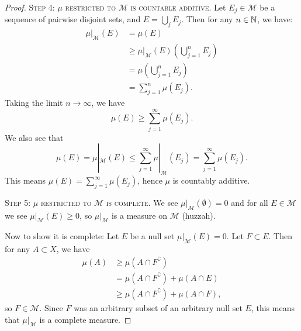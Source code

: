 \begin{proof}
\textsc{Step 4: $\mu$ restricted to $\mathcal{M}$ is countable additive.}
Let $E_{j}\in\mathcal{M}$ be a sequence of pairwise disjoint sets, and
$E=\bigcup_{j}E_{j}$. Then for any $n\in\mathbb{N}$, we have:
\begin{subequations}
  \begin{align}
\mu|_{\mathcal{M}}(E) &= \mu(E)\\
&\geq\mu|_{\mathcal{M}}(E)\left(\bigcup^{n}_{j=1}E_{j}\right)\\
&=\mu\left(\bigcup^{n}_{j=1}E_{j}\right)\\
&=\sum^{n}_{j=1}\mu(E_{j}).
  \end{align}
\end{subequations}
Taking the limit $n\to\infty$, we have
\begin{equation}
\mu(E)\geq\sum^{\infty}_{j=1}\mu(E_{j}).
\end{equation}
We also see that
\begin{equation}
\mu(E)=\mu|_{\mathcal{M}}(E)\leq\sum^{\infty}_{j=1}\mu|_{\mathcal{M}}(E_{j})=\sum^{\infty}_{j=1}\mu(E_{j}).
\end{equation}
This means $\mu(E)=\sum^{\infty}_{j=1}\mu(E_{j})$, hence $\mu$ is
countably additive.

\textsc{Step 5: $\mu$ restricted to $\mathcal{M}$ is complete.}
We see $\mu|_{\mathcal{M}}(\emptyset)=0$ and for all $E\in\mathcal{M}$
we see $\mu|_{\mathcal{M}}(E)\geq0$, so $\mu|_{\mathcal{M}}$ is a
measure on $\mathcal{M}$ (huzzah).

Now to show it is complete: Let $E$ be a null set $\mu|_{\mathcal{M}}(E)=0$. Let
$F\subset E$. Then for any $A\subset X$, we have
\begin{subequations}
  \begin{align}
\mu(A) &\geq\mu(A\cap F^{\complement})\\
&=\mu(A\cap F^{\complement})+\mu(A\cap E)\\
&\geq\mu(A\cap F^{\complement})+\mu(A\cap F),
  \end{align}
\end{subequations}
so $F\in\mathcal{M}$. Since $F$ was an arbitrary subset of an
arbitrary null set $E$, this means that $\mu|_{\mathcal{M}}$ is a
complete measure.
\end{proof}
